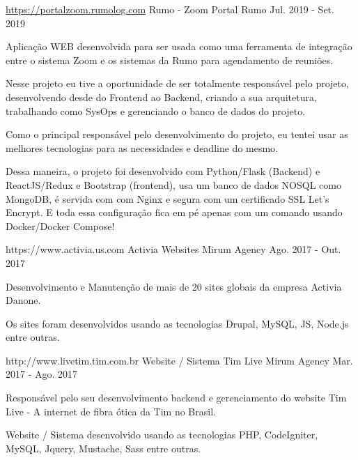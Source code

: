 \begin{cventries}
  \cventry
     {\hyperref[https://portalzoom.rumolog.com]{https://portalzoom.rumolog.com}}
    {Rumo - Zoom Portal }%
    {Rumo} %
    {Jul. 2019 - Set. 2019} %
    {
      \begin{cvitems} %
       \item{ Aplicação WEB desenvolvida para ser usada como uma ferramenta de integração entre o sistema Zoom e os sistemas da Rumo para agendamento de reuniões.}
       \item{Nesse projeto eu tive a oportunidade de ser totalmente responsável pelo projeto, desenvolvendo desde do Frontend ao Backend, criando a sua arquitetura, trabalhando como SysOps e gerenciando o banco de dados do projeto.}
        \item{Como o principal responsável pelo desenvolvimento do projeto, eu tentei usar as melhores tecnologias para as necessidades e deadline do mesmo.}
         \item{Dessa maneira, o projeto foi desenvolvido com Python/Flask (Backend) e ReactJS/Redux e Bootstrap (frontend), usa um banco de dados NOSQL como MongoDB, é servida com com Nginx e segura com um certificado SSL Let’s Encrypt. E toda essa configuração fica em pé apenas com um comando usando Docker/Docker Compose!}
      \end{cvitems}
    }

  \cventry
    {https://www.activia.us.com} %
    {Activia Websites} %
    {Mirum Agency} %
    {Ago. 2017 - Out. 2017} %
    {
      \begin{cvitems} %
        \item {Desenvolvimento e Manutenção de mais de 20 sites globais da empresa Activia Danone.}
        \item {Os sites foram desenvolvidos usando as tecnologias Drupal, MySQL, JS, Node.js entre outras.}
      \end{cvitems}
    }


  \cventry
    {http://www.livetim.tim.com.br} %
    {Website / Sistema Tim Live} %
    {Mirum Agency} %
    {Mar. 2017 - Ago. 2017} %
    {
      \begin{cvitems} %
        \item {Responsável pelo seu desenvolvimento backend  e gerenciamento do website Tim Live - A internet de fibra ótica da Tim no Brasil.}
        \item {Website / Sistema desenvolvido usando as tecnologias PHP, CodeIgniter, MySQL, Jquery, Mustache, Sass entre outras.}
      \end{cvitems}
    }


\end{cventries}

